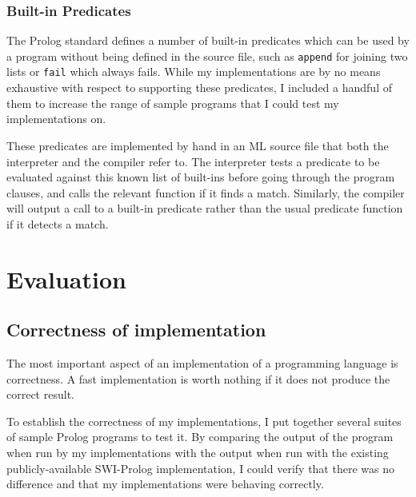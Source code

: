\documentclass[12pt]{article}
\begin{document}
\subsubsection{Built-in Predicates}

The Prolog standard defines a number of built-in predicates which can be used by a program without being defined in the source file, such as \verb|append| for joining two lists or \verb|fail| which always fails. 
While my implementations are by no means exhaustive with respect to supporting these predicates, I included a handful of them to increase the range of sample programs that I could test my implementations on.

These predicates are implemented by hand in an ML source file that both the interpreter and the compiler refer to.
The interpreter tests a predicate to be evaluated against this known list of built-ins before going through the program clauses, and calls the relevant function if it finds a match. 
Similarly, the compiler will output a call to a built-in predicate rather than the usual predicate function if it detects a match.


\newpage

\section{Evaluation}



\subsection{Correctness of implementation}

The most important aspect of an implementation of a programming language is correctness. 
A fast implementation is worth nothing if it does not produce the correct result.

To establish the correctness of my implementations, I put together several suites of sample Prolog programs to test it.
By comparing the output of the program when run by my implementations with the output when run with the existing publicly-available SWI-Prolog implementation, I could verify that there was no difference and that my implementations were behaving correctly.
\end{document}

